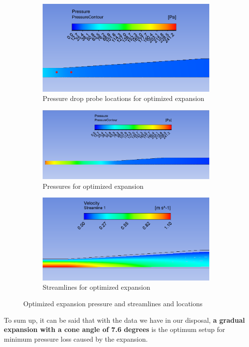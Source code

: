 \begin{figure}[H]
\centering

\begin{subfigure}{.48\textwidth}
    \includegraphics[width=.95\linewidth]{images/task3/optimized_locations.png}
    \caption{Pressure drop probe locations for optimized expansion}
    \label{fig:04_gradual_locs}
\end{subfigure}
\hfill
\begin{subfigure}{.48\textwidth}
    \includegraphics[width=.95\linewidth]{images/task3/optimized_pressure.png}
    \caption{Pressures for optimized expansion}
    \label{fig:04_gradual_pressure}
\end{subfigure}

\begin{subfigure}{.7\textwidth}
    \includegraphics[width=.95\linewidth]{images/task3/optimized_streamline.png}
    \caption{Streamlines for optimized expansion}
    \label{fig:04_gradual_stream}
\end{subfigure}

\caption{Optimized expansion pressure and streamlines and locations}
\label{fig:opt_figure}
\end{figure}



\noindent To sum up, it can be said that with the data we have in our disposal, \textbf{a gradual expansion with a cone angle of 7.6 degrees} is the optimum setup for minimum pressure loss caused by the expansion.
